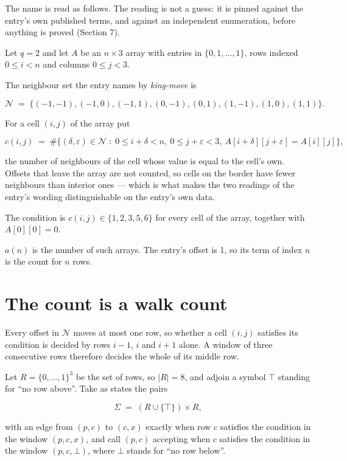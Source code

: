 \documentclass[11pt]{article}
\theoremstyle{definition}
\begin{document}
The name is read as follows. The reading is not a guess: it is pinned against the entry's own published terms, and against an independent enumeration, before anything is proved (Section 7).

Let $q = 2$ and let $A$ be an $n \times 3$ array with entries in $\{0,1,\dots,1\}$, rows indexed $0 \le i < n$ and columns $0 \le j < 3$.

The neighbour set the entry names by {\itshape king-move} is

\[\mathcal{N} \;=\; \{(-1,-1), (-1,0), (-1,1), (0,-1), (0,1), (1,-1), (1,0), (1,1)\}.\]

For a cell $(i,j)$ of the array put

\[c(i,j) \;=\; \#\bigl\{(\delta,\varepsilon)\in\mathcal{N} \;:\; 0\le i+\delta<n,\ 0\le j+\varepsilon<3,\ A[i+\delta][j+\varepsilon] = A[i][j]\bigr\},\]

the number of neighbours of the cell whose value is equal to the cell's own. Offsets that leave the array are not counted, so cells on the border have fewer neighbours than interior ones --- which is what makes the two readings of the entry's wording distinguishable on the entry's own data.

The condition is $c(i,j) \in \{1, 2, 3, 5, 6\}$ for every cell of the array, together with $A[0][0]=0$.

$a(n)$ is the number of such arrays. The entry's offset is 1, so its term of index $n$ is the count for $n$ rows.

\section{The count is a walk count}

Every offset in $\mathcal{N}$ moves at most one row, so whether a cell $(i,j)$ satisfies its condition is decided by rows $i-1$, $i$ and $i+1$ alone. A window of three consecutive rows therefore decides the whole of its middle row.

Let $R = \{0,\dots,1\}^{3}$ be the set of rows, so $|R| = 8$, and adjoin a symbol $\top$ standing for ``no row above''. Take as states the pairs

\[\Sigma \;=\; (R \cup \{\top\}) \times R,\]

with an edge from $(p,c)$ to $(c,x)$ exactly when row $c$ satisfies the condition in the window $(p,c,x)$, and call $(p,c)$ accepting when $c$ satisfies the condition in the window $(p,c,\bot)$, where $\bot$ stands for ``no row below''.
\end{document}
